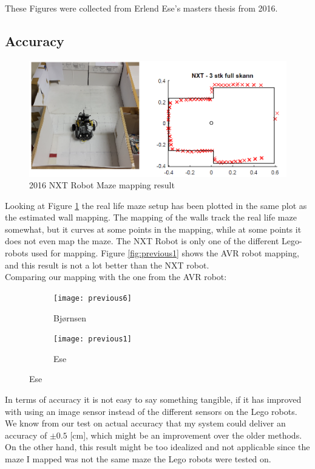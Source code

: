 These Figures were collected from Erlend Ese's masters thesis \cite{ese} from 2016.\\

\subsection{Accuracy}
\begin{figure}[H]
\centering
\includegraphics[width=\textwidth]{fig/previous5}
  \caption{2016 NXT Robot Maze mapping result}
  \label{fig:previous5}
\end{figure}
Looking at Figure \ref{fig:previous5} the real life maze setup has been plotted in the same plot as the estimated wall mapping. The mapping of the walls track the real life maze somewhat, but it curves at some points in the mapping, while at some points it does not even map the maze. The NXT Robot is only one of the different Lego-robots used for mapping. Figure \ref{fig:previous1} shows the AVR robot mapping, and this result is not a lot better than the NXT robot. \\

Comparing our mapping with the one from the AVR robot:
\begin{figure}[H]
\begin{subfigure}{.5\textwidth}
  \centering
  \texttt{[image: previous6]}
  \caption{Bjørnsen}
\end{subfigure}
\begin{subfigure}{.5\textwidth}
  \centering
  \texttt{[image: previous1]}
  \caption{Ese}
\end{subfigure}
\end{figure}
In terms of accuracy it is not easy to say something tangible, if it has improved with using an image sensor instead of the different sensors on the Lego robots. We know from our test on actual accuracy that my system could deliver an accuracy of $\pm0.5$ [cm], which might be an improvement over the older methods. On the other hand, this result might be too idealized and not applicable since the maze I mapped was not the same maze the Lego robots were tested on.\\

